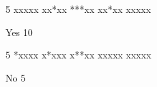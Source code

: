 
\begin{myverbbox}[\small]{\vinput}
    5
    xxxxx
    xx*xx
    ***xx
    xx*xx
    xxxxx
\end{myverbbox}
\begin{myverbbox}[\small]{\voutput}
    Yes
    10
\end{myverbbox}


\begin{myverbbox}[\small]{\vinput}
    5
    *xxxx
    x*xxx
    x**xx
    xxxxx
    xxxxx
\end{myverbbox}
\begin{myverbbox}[\small]{\voutput}
    No
    5
\end{myverbbox}


